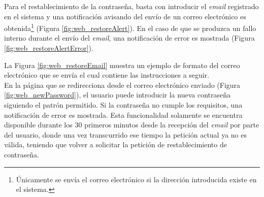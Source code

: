 \documentclass[12pt,a4paper, twoside]{report}
\begin{document}
	Para el restablecimiento de la contraseña, basta con introducir el \textit{email} registrado en el sistema y una notificación avisando del envío de un correo electrónico es obtenida\footnote{Únicamente se envía el correo electrónico si la dirección introducida existe en el sistema.} (Figura \ref{fig:web_restoreAlert}). En el caso de que se produzca un fallo interno durante el envío del \textit{email}, una notificación de error es mostrada (Figura \ref{fig:web_restoreAlertError}).
		
%		

	 La Figura \ref{fig:web_restoreEmail} muestra un ejemplo de formato del correo electrónico que se envía el cual contiene las instrucciones a seguir.   \\

	
	En la página que se redirecciona desde el correo electrónico enviado (Figura \ref{fig:web_newPassword}), el usuario puede introducir la nueva contraseña siguiendo el patrón permitido. Si la contraseña no cumple los requisitos, una notificación de error es mostrada. Esta funcionalidad solamente se encuentra disponible durante los 30 primeros minutos desde la recepción del \textit{email} por parte del usuario, donde una vez transcurrido ese tiempo la petición actual ya no es válida, teniendo que volver a solicitar la petición de restablecimiento de contraseña.
	
\end{document}
